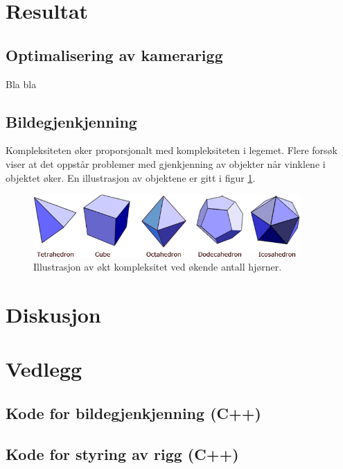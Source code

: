 \documentclass[a4paper, 11pt]{article}
\begin{document}
 \newpage
\section{Resultat}

\subsection{Optimalisering av kamerarigg}
Bla bla

\subsection{Bildegjenkjenning}

Kompleksiteten øker proporsjonalt med kompleksiteten i legemet. Flere forsøk viser at det oppstår problemer med gjenkjenning av objekter når vinklene i objektet øker. En illustrasjon av objektene er gitt i figur \ref{fig:platonic}.

\begin{figure}[h]
\centering
\includegraphics[width=4in]{figurer/platonic-solids.gif}
\caption{Illustrasjon av økt kompleksitet ved økende antall hjørner. \cite{platonic} }
\label{fig:platonic}
\end{figure}

 \newpage
\section{Diskusjon}




\newpage



 \newpage
\section{Vedlegg}

\subsection{Kode for bildegjenkjenning (C++)}

\subsection{Kode for styring av rigg (C++)}
\end{document}
